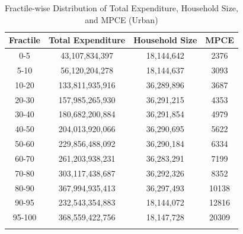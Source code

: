 \documentclass{article}
\begin{document}
	
	\begin{longtable}{|c|c|c|c|}
		\hline
		\textbf{Fractile} & \textbf{Total Expenditure} & \textbf{Household Size} & \textbf{MPCE} \\ \hline
		\endhead
		
		0-5     & 43,107,834,397   & 18,144,642   & 2376 \\ \hline
		5-10    & 56,120,204,278   & 18,144,637   & 3093 \\ \hline
		10-20   & 133,811,935,916  & 36,289,896   & 3687 \\ \hline
		20-30   & 157,985,265,930  & 36,291,215   & 4353 \\ \hline
		30-40   & 180,682,200,884  & 36,291,854   & 4979 \\ \hline
		40-50   & 204,013,920,066  & 36,290,695   & 5622 \\ \hline
		50-60   & 229,856,488,092  & 36,290,184   & 6334 \\ \hline
		60-70   & 261,203,938,231  & 36,283,291   & 7199 \\ \hline
		70-80   & 303,117,438,687  & 36,292,326   & 8352 \\ \hline
		80-90   & 367,994,935,413  & 36,297,493   & 10138 \\ \hline
		90-95   & 232,543,354,883  & 18,144,072   & 12816 \\ \hline
		95-100  & 368,559,422,756  & 18,147,728   & 20309 \\ \hline
		
		\caption{Fractile-wise Distribution of Total Expenditure, Household Size, and MPCE (Urban)}
		\label{table:fractile_urban}
	\end{longtable}
	
\end{document}
